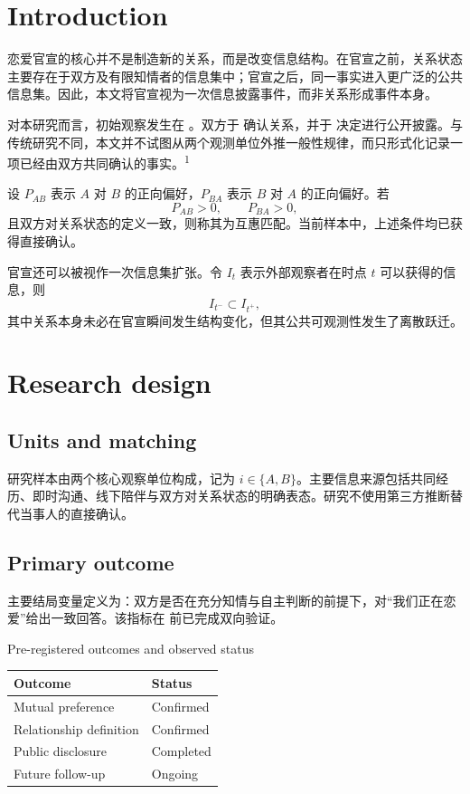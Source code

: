 \documentclass[9pt,twocolumn]{extarticle}
\begin{document}
\setcounter{page}{520}
\makeJOLfrontmatter

\section{Introduction}
恋爱官宣的核心并不是制造新的关系，而是改变信息结构。在官宣之前，关系状态主要存在于双方及有限知情者的信息集中；官宣之后，同一事实进入更广泛的公共信息集。因此，本文将官宣视为一次信息披露事件，而非关系形成事件本身。

对本研究而言，初始观察发生在 \FirstMeetingDate{}。双方于 \RelationshipDate{} 确认关系，并于 \AnnouncementDate{} 决定进行公开披露。与传统研究不同，本文并不试图从两个观测单位外推一般性规律，而只形式化记录一项已经由双方共同确认的事实。\textsuperscript{1}

设 $P_{AB}$ 表示 $A$ 对 $B$ 的正向偏好，$P_{BA}$ 表示 $B$ 对 $A$ 的正向偏好。若
\begin{equation}
P_{AB}>0,\qquad P_{BA}>0,
\end{equation}
且双方对关系状态的定义一致，则称其为互惠匹配。当前样本中，上述条件均已获得直接确认。

官宣还可以被视作一次信息集扩张。令 $I_t$ 表示外部观察者在时点 $t$ 可以获得的信息，则
\begin{equation}
I_{t^-}\subset I_{t^+},
\end{equation}
其中关系本身未必在官宣瞬间发生结构变化，但其公共可观测性发生了离散跃迁。

\section{Research design}
\subsection{Units and matching}
研究样本由两个核心观察单位构成，记为 $i\in\{A,B\}$。主要信息来源包括共同经历、即时沟通、线下陪伴与双方对关系状态的明确表态。研究不使用第三方推断替代当事人的直接确认。

\clearpage
\subsection{Primary outcome}
主要结局变量定义为：双方是否在充分知情与自主判断的前提下，对“我们正在恋爱”给出一致回答。该指标在 \AnnouncementDate{} 前已完成双向验证。

\begin{JOLtable}{Pre-registered outcomes and observed status}
\begin{tabularx}{\columnwidth}{@{}Xl@{}}\toprule
Outcome & Status\\\midrule
Mutual preference & Confirmed\\
Relationship definition & Confirmed\\
Public disclosure & Completed\\
Future follow-up & Ongoing\\\bottomrule
\end{tabularx}
\end{JOLtable}
\end{document}
